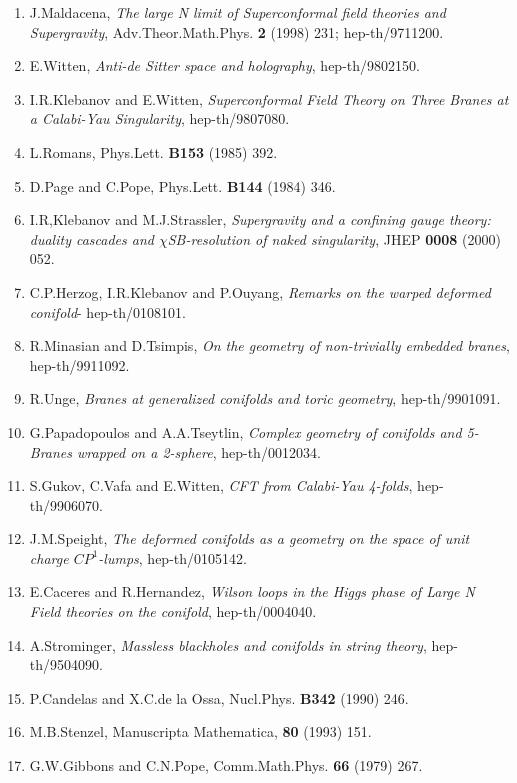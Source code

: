 \documentclass[a4paper,12pt]{article}
\begin{document}
{\begin{enumerate}
\item J.Maldacena, {\it{The large N limit of Superconformal field theories 
                   and Supergravity}}, Adv.Theor.Math.Phys. {\bf{2}} (1998)
                   231; hep-th/9711200.  
\item E.Witten, {\it{Anti-de Sitter space and holography}}, hep-th/9802150.  
\item I.R.Klebanov and E.Witten, {\it{Superconformal Field Theory on Three 
                   Branes at a Calabi-Yau Singularity}}, hep-th/9807080. 
\item L.Romans, Phys.Lett. {\bf{B153}} (1985) 392. 
\item D.Page and C.Pope, Phys.Lett. {\bf{B144}} (1984) 346.  
\item I.R,Klebanov and M.J.Strassler, {\it{Supergravity and a confining 
                  gauge theory: duality cascades and $\chi$SB-resolution of 
                  naked singularity}}, JHEP {\bf{0008}} (2000) 052. 
\item C.P.Herzog, I.R.Klebanov and P.Ouyang, {\it{Remarks on the warped 
                  deformed conifold}}- hep-th/0108101.
\item R.Minasian and D.Tsimpis, {\it{On the geometry of non-trivially 
                  embedded branes}}, hep-th/9911092.
\item R.Unge, {\it{Branes at generalized conifolds and toric geometry}}, 
               hep-th/9901091.
\item G.Papadopoulos and A.A.Tseytlin, {\it{Complex geometry of conifolds 
                 and 5-Branes wrapped on a 2-sphere}}, hep-th/0012034.
\item S.Gukov, C.Vafa and E.Witten, {\it{CFT from Calabi-Yau 4-folds}}, 
               hep-th/9906070.
\item J.M.Speight, {\it{The deformed conifolds as a geometry on the space 
                of unit charge $CP^1$-lumps}}, hep-th/0105142.
\item E.Caceres and R.Hernandez, {\it{Wilson loops in the Higgs phase of 
               Large N Field theories on the conifold}}, hep-th/0004040.
\item A.Strominger, {\it{Massless blackholes and conifolds in string theory}},
               hep-th/9504090.
\item P.Candelas and X.C.de la Ossa, Nucl.Phys. {\bf{B342}} (1990) 246.
\item M.B.Stenzel, Manuscripta Mathematica, {\bf{80}} (1993) 151.
\item G.W.Gibbons and C.N.Pope, Comm.Math.Phys. {\bf{66}} (1979) 267.

\end{enumerate}}
\end{document}
